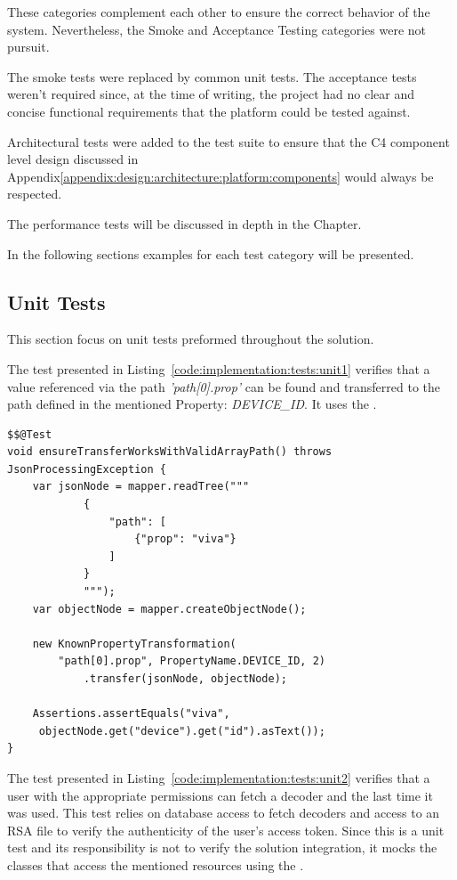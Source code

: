 These categories complement each other to ensure the correct behavior of the system. Nevertheless, the Smoke and Acceptance Testing categories were not pursuit.

The smoke tests were replaced by common unit tests. The acceptance tests weren't required since, at the time of writing, the project had no clear and concise functional requirements that the platform could be tested against.

Architectural tests were added to the test suite to ensure that the C4 component level design discussed in Appendix\ref{appendix:design:architecture:platform:components} would always be respected.

The performance tests will be discussed in depth in the  Chapter.

In the following sections examples for each test category will be presented.

\subsection{Unit Tests}
\label{subsec:implementation:tests:unit}

This section focus on unit tests preformed throughout the solution.

The test presented in Listing~\ref{code:implementation:tests:unit1} verifies that a value referenced via the path \textit{'path[0].prop'} can be found and transferred to the path defined in the mentioned Property: \textit{DEVICE\_ID}.
It uses the .

\begin{lstlisting}[style=Java, caption=Unit Test Example in \textit{iot-core} package, label={code:implementation:tests:unit1}]
$$@Test
void ensureTransferWorksWithValidArrayPath() throws JsonProcessingException {
    var jsonNode = mapper.readTree("""
            {
                "path": [
                    {"prop": "viva"}
                ]
            }
            """);
    var objectNode = mapper.createObjectNode();

    new KnownPropertyTransformation(
        "path[0].prop", PropertyName.DEVICE_ID, 2)
            .transfer(jsonNode, objectNode);

    Assertions.assertEquals("viva",
     objectNode.get("device").get("id").asText());
}
\end{lstlisting}

The test presented in Listing~\ref{code:implementation:tests:unit2} verifies that a user with the appropriate permissions can fetch a decoder and the last time it was used. This test relies on database access to fetch decoders and access to an RSA file to verify the authenticity of the user's access token. Since this is a unit test and its responsibility is not to verify the solution integration, it mocks the classes that access the mentioned resources using the .

